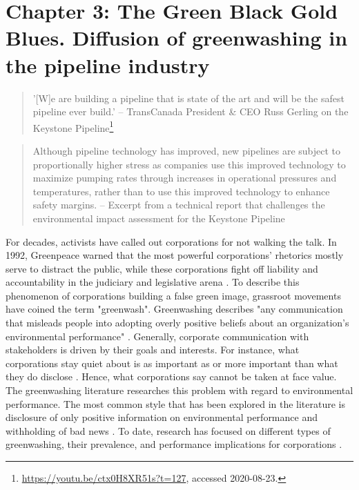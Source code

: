 \section{Chapter 3: The Green Black Gold Blues. Diffusion of greenwashing in the pipeline industry}

\begin{quote}
	'[W]e are building a pipeline that is state of the art and will be the safest pipeline  ever build.' -- TransCanada President \& CEO Russ Gerling on the Keystone Pipeline\footnote{\url{https://youtu.be/ctx0H8XR51s?t=127}, accessed 2020-08-23.}
\end{quote}

\begin{quote}
	Although pipeline technology has improved, new pipelines are subject to proportionally higher stress as companies use this improved technology to maximize pumping rates through increases in operational pressures and temperatures, rather than to use this improved technology to enhance safety margins. -- Excerpt from a technical report that challenges the environmental impact assessment for the Keystone Pipeline \citep[p. 4]{Stansbury2011}
\end{quote}

For decades, activists have called out corporations for not walking the talk. In 1992, Greenpeace warned that the most powerful corporations' rhetorics mostly serve to distract the public, while these corporations fight off liability and accountability in the judiciary and legislative arena \citep{Bruno1992}. To describe this phenomenon of corporations building a false green image, grassroot movements have coined the term "greenwash". Greenwashing describes "any communication that misleads people into adopting overly positive beliefs about an organization's environmental performance" \citep[p. 225]{Lyon2015}. Generally, corporate communication with stakeholders is driven by their goals and interests. For instance, what corporations stay quiet about is as important as or more important than what they do disclose \citep{Kim2015}. Hence, what corporations say cannot be taken at face value. The greenwashing literature researches this problem with regard to environmental performance. The most common style that has been explored in the literature is disclosure of only positive information on environmental performance and withholding of bad news \citep{Lyon2011}. To date, research has focused on different types of greenwashing, their prevalence, and performance implications for corporations \citep{Marquis2016, Ramus2005, Seele2017, Kassinis2018}.

